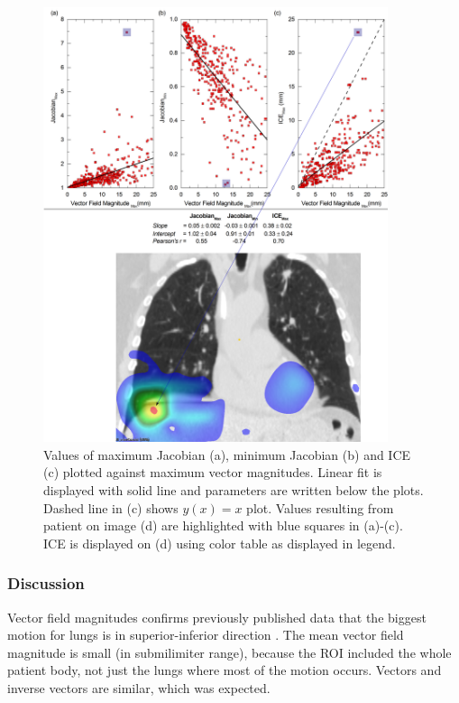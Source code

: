 \documentclass[type=dr, dr=rernat, accentcolor=tud7b,colorbacktitle, bigchapter, openright, twoside, 12pt ]{tudthesis}
\begin{document}
\begin{figure}[H]
	\begin{center}		
		\includegraphics[width=0.9\textwidth]{./Images/maxVf_lung.png}
		\caption{Values of maximum Jacobian (a), minimum Jacobian (b) and ICE (c) plotted against maximum vector magnitudes. Linear fit is displayed with solid line and parameters are written below the plots. Dashed line in (c) shows $y(x)= x$ plot. Values resulting from patient on image (d) are highlighted with blue squares in (a)-(c).
			ICE is displayed on (d) using color table as displayed in legend.}
		\label{maxvf}
	\end{center}
\end{figure}

\newpage

\subsubsection{Discussion}

Vector field magnitudes confirms previously published data that the biggest motion for lungs is in superior-inferior direction \cite{Seppenwoolde2002, Britton2007, Liu2007}. The mean vector field magnitude is small (in submilimiter range), 
because the ROI included the whole patient body, not just the lungs where most of the motion occurs. Vectors and inverse vectors are similar, which was expected.
\end{document}
